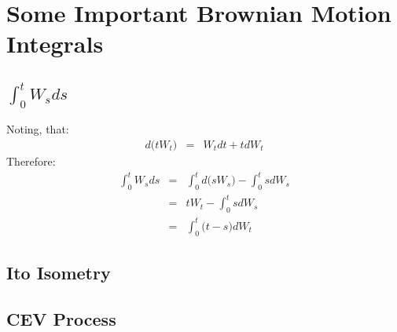 \subsection{}


\section{Some Important Brownian Motion Integrals}

\subsection{$\int_{0}^{t}W_{s}ds$}
Noting, that:
\begin{eqnarray}
	d\Big(tW_{t}\Big) &=& W_{t}dt + tdW_{t}
\end{eqnarray}
Therefore:
\begin{eqnarray}
	\int_{0}^{t}W_{s}ds &=& \int_{0}^{t}d\Big(sW_{s}\Big) - \int_{0}^{t}sdW_{s}\\
	&=& tW_{t} - \int_{0}^{t}sdW_{s}\\
	&=& \int_{0}^{t}\Big(t - s\Big)dW_{t}
\end{eqnarray}


\subsection{Ito Isometry}

\subsection{CEV Process}